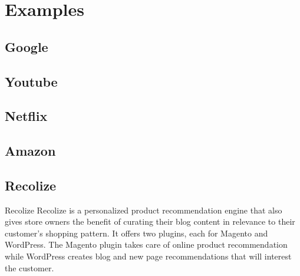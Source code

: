 \section[Examples]{Examples}

\subsection[Google]{Google}
\begin{frame}
\end{frame}
\subsection[Youtube]{Youtube}
\begin{frame}
\end{frame}
\subsection[Netflix]{Netflix}
\begin{frame}
\end{frame}
\subsection[Amazon]{Amazon}
\begin{frame}
\end{frame}
\subsection[Recolize]{Recolize}
\begin{frame}{Recolize}
    Recolize is a personalized product recommendation engine that also gives store owners the benefit of curating their blog content in relevance to their customer’s shopping pattern. It offers two plugins, each for Magento and WordPress. The Magento plugin takes care of online product recommendation while WordPress creates blog and new page recommendations that will interest the customer.
\end{frame}
\begin{frame}
\end{frame}
